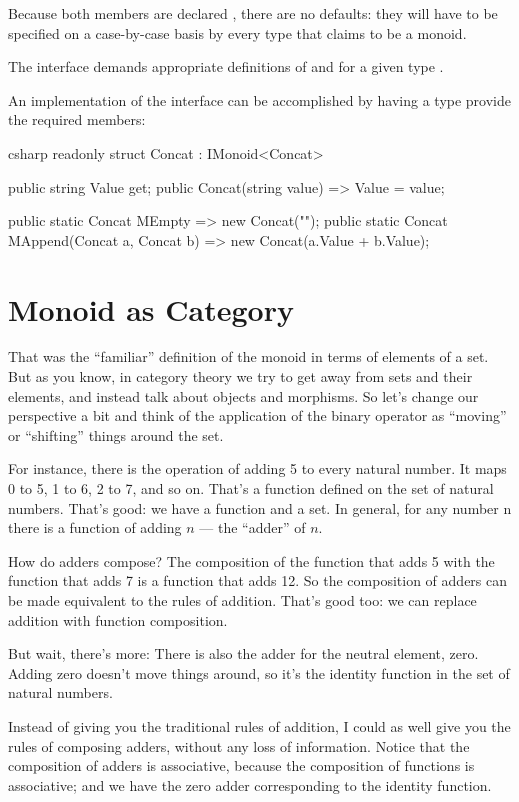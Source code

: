Because both members are declared , there are no
defaults: they will have to be specified on a case-by-case basis by
every type that claims to be a monoid.

The interface  demands appropriate definitions of
 and  for a given type .

An implementation of the  interface can be accomplished by
having a type provide the required members:

\begin{snip}{csharp}
readonly struct Concat : IMonoid<Concat>
{
    public string Value { get; }
    public Concat(string value) => Value = value;

    public static Concat MEmpty => new Concat("");
    public static Concat MAppend(Concat a, Concat b) =>
        new Concat(a.Value + b.Value);
}
\end{snip}

\section{Monoid as Category}

That was the ``familiar'' definition of the monoid in terms of elements
of a set. But as you know, in category theory we try to get away from
sets and their elements, and instead talk about objects and morphisms.
So let's change our perspective a bit and think of the application of
the binary operator as ``moving'' or ``shifting'' things around the set.

For instance, there is the operation of adding 5 to every natural
number. It maps 0 to 5, 1 to 6, 2 to 7, and so on. That's a function
defined on the set of natural numbers. That's good: we have a function
and a set. In general, for any number n there is a function of adding $n$
--- the ``adder'' of $n$.

How do adders compose? The composition of the function that adds 5 with
the function that adds 7 is a function that adds 12. So the composition
of adders can be made equivalent to the rules of addition. That's good
too: we can replace addition with function composition.

But wait, there's more: There is also the adder for the neutral element,
zero. Adding zero doesn't move things around, so it's the identity
function in the set of natural numbers.

Instead of giving you the traditional rules of addition, I could as well
give you the rules of composing adders, without any loss of information.
Notice that the composition of adders is associative, because the
composition of functions is associative; and we have the zero adder
corresponding to the identity function.


